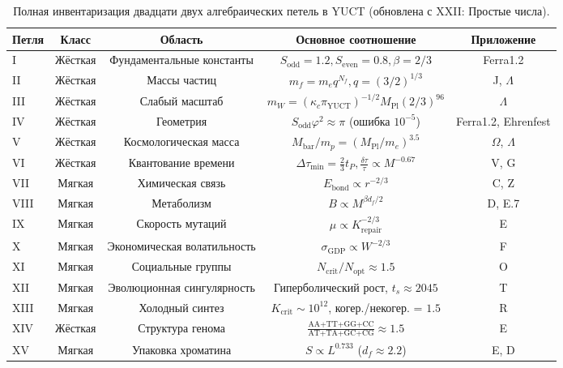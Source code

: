 \documentclass[12pt,a4paper]{article}
\begin{document}
	\begin{table}[htbp]
		\centering
		\caption{Полная инвентаризация двадцати двух алгебраических петель в YUCT (обновлена с XXII: Простые числа).}
		\label{tab:all-loops-22}
		\footnotesize
		\begin{tabular}{l c c c c}
			\toprule
			\textbf{Петля} & \textbf{Класс} & \textbf{Область} & \textbf{Основное соотношение} & \textbf{Приложение} \\
			\midrule
			I   & Жёсткая & Фундаментальные константы & \(S_{\mathrm{odd}}=1.2, S_{\mathrm{even}}=0.8, \beta=2/3\) & Ferra1.2 \\
			II  & Жёсткая & Массы частиц & \(m_f = m_e q^{N_f}, q=(3/2)^{1/3}\) & J, \(\Lambda\) \\
			III & Жёсткая & Слабый масштаб & \(m_W = (\kappa_c \pi_{\mathrm{YUCT}})^{-1/2} M_{\mathrm{Pl}} (2/3)^{96}\) & \(\Lambda\) \\
			IV  & Жёсткая & Геометрия & \(S_{\mathrm{odd}}\varphi^2 \approx \pi\) (ошибка \(10^{-5}\)) & Ferra1.2, Ehrenfest \\
			V   & Жёсткая & Космологическая масса & \(M_{\mathrm{bar}}/m_p = (M_{\mathrm{Pl}}/m_e)^{3.5}\) & \(\Omega\), \(\Lambda\) \\
			VI  & Жёсткая & Квантование времени & \(\Delta\tau_{\min} = \frac{2}{3}t_P, \frac{\delta\tau}{\tau} \propto M^{-0.67}\) & V, G \\
			VII & Мягкая & Химическая связь & \(E_{\mathrm{bond}} \propto r^{-2/3}\) & C, Z \\
			VIII& Мягкая & Метаболизм & \(B \propto M^{\beta d_f/2}\) & D, E.7 \\
			IX  & Мягкая & Скорость мутаций & \(\mu \propto K_{\mathrm{repair}}^{-2/3}\) & E \\
			X   & Мягкая & Экономическая волатильность & \(\sigma_{\mathrm{GDP}} \propto W^{-2/3}\) & F \\
			XI  & Мягкая & Социальные группы & \(N_{\mathrm{crit}}/N_{\mathrm{opt}} \approx 1.5\) & O \\
			XII & Мягкая & Эволюционная сингулярность & Гиперболический рост, \(t_s \approx 2045\) & T \\
			XIII& Мягкая & Холодный синтез & \(K_{\mathrm{crit}} \sim 10^{12}\), когер./некогер. = \(1.5\) & R \\
			XIV & Жёсткая & Структура генома & \(\frac{\text{AA+TT+GG+CC}}{\text{AT+TA+GC+CG}} \approx 1.5\) & E \\
			XV  & Мягкая & Упаковка хроматина & \(S \propto L^{0.733}\) (\(d_f \approx 2.2\)) & E, D \\

\end{tabular}
\end{table}
\end{document}
